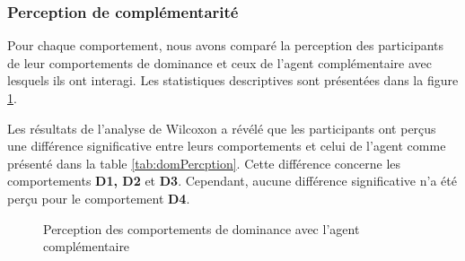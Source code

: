 	\subsubsection{Perception de complémentarité}
	
	Pour chaque comportement, nous avons comparé la perception des participants de leur comportements de dominance et ceux de l'agent complémentaire avec lesquels ils ont interagi. Les statistiques descriptives sont présentées dans la figure \ref{fig:comp}. 
	
	Les résultats de l'analyse de Wilcoxon a révélé que les participants ont perçus une différence significative entre leurs comportements et celui de l'agent comme présenté dans la table \ref{tab:domPercption}. Cette différence concerne les comportements \textbf{D1, D2} et \textbf{D3}. Cependant, aucune différence significative n'a été perçu pour le comportement \textbf{D4}. 
	\begin{figure}[h]
		\centering
		
		\caption{Perception des comportements de dominance avec l'agent complémentaire}
		\label{fig:comp}
	\end{figure}	
	
